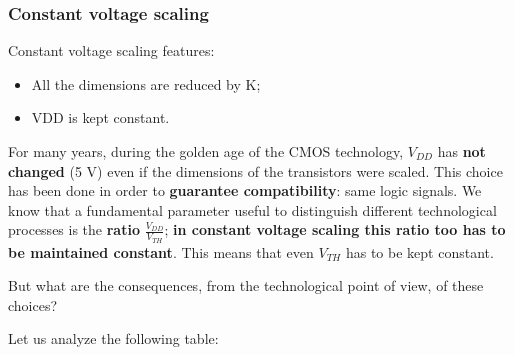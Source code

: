 \documentclass[a4paper, 12pt, twoside, openright]{report}
\begin{document}
{\subsubsection{Constant voltage scaling}

Constant voltage scaling features:

\begin{itemize}
\item All the dimensions are reduced by K;
\item VDD is kept constant.
\end{itemize}

For many years, during the golden age of the CMOS technology, $V_{DD}$ has \textbf{not changed} (5 V) even if the dimensions of the transistors were scaled. This choice has been done in order to \textbf{guarantee compatibility}: same logic signals. We know that a fundamental parameter useful to distinguish different technological processes is the \textbf{ratio} $\frac{V_{DD}}{V_{TH}}$; \textbf{in constant voltage scaling this ratio too has to be maintained constant}. This means that even $V_{TH}$ has to be kept constant.

But what are the consequences, from the technological point of view, of these choices?

Let us analyze the following table:

}
\end{document}
